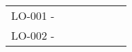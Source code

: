 \begin{landscape}
\begin{table}[]
{\begin{tabular}{lllllll}
LO-001 -                                                                    &                                                                                                                                                                                                                                                                &                                                                                                                                                                                                                                                                &                         &                                                                                                                                                                  &                                                                                                                                                 &                                                                                                                                        \\
LO-002 -                                                                    &                                                                                                                                                                                                                                                                &                                                                                                                                                                                                                                                                &                         &                                                                                                                                                                  &                                                                                                                                                 &                                                                                                                                        \\

\end{tabular}}
\end{table}
\end{landscape}
